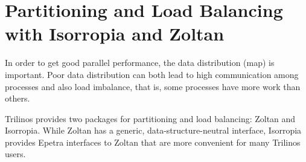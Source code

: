 % 
% 
% 
%  
%  
% 

\chapter{Partitioning and Load Balancing with Isorropia and Zoltan}
\label{chap:zoltan}


\begin{introchapter}
 
In order to get good parallel performance, the data 
distribution (map) is important. Poor data distribution can both
lead to high communication among processes and also load imbalance,
that is, some processes have more work than others. 

Trilinos provides two packages for partitioning and load balancing: Zoltan and Isorropia. While Zoltan has a generic, data-structure-neutral interface, Isorropia provides Epetra interfaces to Zoltan that are more convenient for many Trilinos users.
\end{introchapter}


